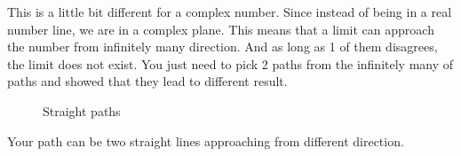 \documentclass[12pt]{book}
\begin{document}
This is a little bit different for a complex number. Since instead of being in a real number line, we are in a complex plane. This means that a limit can approach the number from infinitely many direction. And as long as 1 of them disagrees, the limit does not exist. You just need to pick 2 paths from the infinitely many of paths and showed that they lead to different result.
\begin{figure}[!h]
    \centering
    \caption{Straight paths}
    \label{fig:2.1}
\end{figure}

Your path can be two straight lines approaching from different direction.
\end{document}
